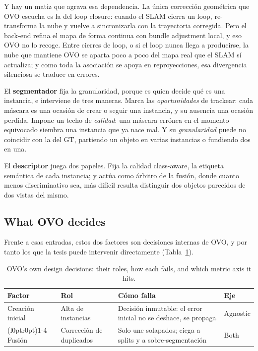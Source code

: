 Y hay un matiz que agrava esa dependencia. La única corrección geométrica que OVO escucha es la del
loop closure: cuando el SLAM cierra un loop, re-transforma la nube y vuelve a sincronizarla con la
trayectoria corregida. Pero el back-end refina el mapa de forma continua con bundle adjustment local,
y eso OVO no lo recoge. Entre cierres de loop, o si el loop nunca llega a producirse, la nube que
mantiene OVO se aparta poco a poco del mapa real que el SLAM sí actualiza; y como toda la asociación
se apoya en reproyecciones, esa divergencia silenciosa se traduce en errores.

El \textbf{segmentador} fija la granularidad, porque es quien decide qué es una instancia, e
interviene de tres maneras. Marca las \emph{oportunidades} de trackear: cada máscara es una ocasión
de crear o seguir una instancia, y su ausencia una ocasión perdida. Impone un techo de
\emph{calidad}: una máscara errónea en el momento equivocado siembra una instancia que ya nace mal. Y
su \emph{granularidad} puede no coincidir con la del GT, partiendo un objeto en varias instancias o
fundiendo dos en una.

El \textbf{descriptor} juega dos papeles. Fija la calidad class-aware, la etiqueta semántica de cada
instancia; y actúa como árbitro de la fusión, donde cuanto menos discriminativo sea, más difícil
resulta distinguir dos objetos parecidos de dos vistas del mismo.

\subsection{What OVO decides}
\label{sec:ovo_internal}

Frente a esas entradas, estos dos factores son decisiones internas de OVO, y por tanto los que la
tesis puede intervenir directamente (Tabla~\ref{tab:factors_internal}).

\begin{table}[h!]
  \centering
  \small
  \setlength{\tabcolsep}{10pt}
  \renewcommand{\arraystretch}{1.15}
  \begin{tabular}{@{}l >{\raggedright\arraybackslash}p{3.7cm} >{\raggedright\arraybackslash}p{6.3cm} l@{}}
    \toprule
    \textbf{Factor} & \textbf{Rol} & \textbf{Cómo falla} & \textbf{Eje} \\
    \midrule
    Creación inicial & Alta de instancias & Decisión inmutable: el error inicial no se deshace, se propaga & Agnostic \\
    \cmidrule(l{0pt}r{0pt}){1-4}
    Fusión & Corrección de duplicados & Solo une solapados; ciega a splits y a sobre-segmentación & Both \\
    \bottomrule
  \end{tabular}
  \caption{OVO's own design decisions: their roles, how each fails, and which metric axis it hits.}
  \label{tab:factors_internal}
\end{table}

